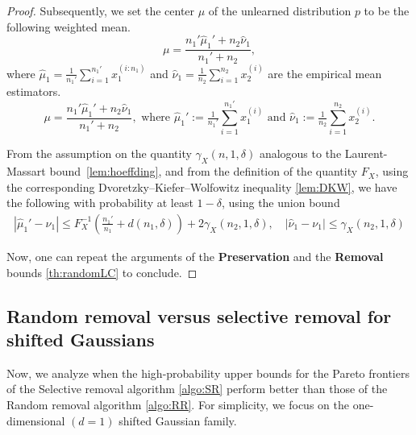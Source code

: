 \begin{proof}
  Subsequently, we set the center $\mu$ of the unlearned distribution $p$ to be the following weighted mean.
    \begin{equation}
        \mu = \frac{n_1' \hat{\mu}_1' + n_2 \hat{\nu}_1}{n_1' + n_2},
    \end{equation}
    where $\hat{\mu}_1 = \tfrac{1}{n_1'} \sum_{i=1}^{n_1'} x_1^{(i:n_1)}$ and $\hat{\nu}_1 = \tfrac{1}{n_2} \sum_{i=1}^{n_2} x_2^{(i)}$ are the empirical mean estimators.
    \begin{equation} \label{eq:empmeanLCSR}
        \mu = \frac{n_1' \hat{\mu}_1' + n_2 \hat{\nu}_1}{n_1' + n_2}, \text{ where }
        \hat{\mu}_1' := \tfrac{1}{n_1'} \sum_{i=1}^{n_1'} x_1^{(i)} \text{ and } \hat{\nu}_1 := \tfrac{1}{n_2} \sum_{i=1}^{n_2} x_2^{(i)}.
    \end{equation}

    
  From the assumption on the quantity $\gamma_X(n,1,\delta)$ analogous to the Laurent-Massart  bound~\ref{lem:hoeffding}, and from the definition of the quantity $F_X$, using  the corresponding Dvoretzky–Kiefer–Wolfowitz inequality \ref{lem:DKW}, we have the following with probability at least $1- \delta$, using the union bound
    \begin{align} \label{eq:hoeffdingLCSR}
        |\hat{\mu}_1' - \nu_1| \leq 
        F_X^{-1}\left(\frac{n_1'}{n_1} +d(n_1, \delta)\right) + 2\gamma_X(n_2, 1,\delta), \quad |\hat{\nu}_1 - \nu_1| \leq  \gamma_X(n_2, 1,\delta)
    \end{align}

    Now, one can repeat the arguments of the \textbf{Preservation}  and the  \textbf{Removal} bounds \ref{th:randomLC} to conclude.
    \end{proof} 



\subsection{Random removal versus selective removal for shifted Gaussians}
\label{app:simple-selective}

Now, we analyze when the high-probability upper bounds for the Pareto frontiers of the Selective removal algorithm \ref{algo:SR} perform better than those of the Random removal algorithm \ref{algo:RR}. For simplicity, we focus on the one-dimensional $(d=1)$ shifted Gaussian family.

\samples*
\samplesselection*

